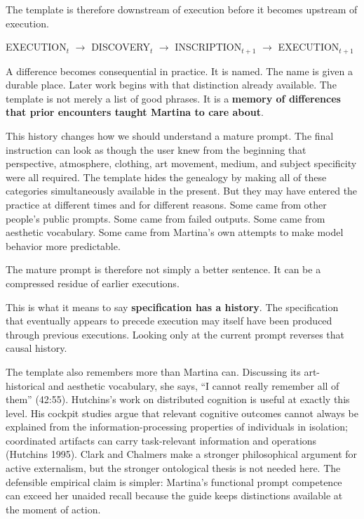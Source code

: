 \documentclass[
  11pt,
  letterpaper,
]{article}
\begin{document}
The template is therefore downstream of execution before it becomes
upstream of execution.

\begin{center}
EXECUTION$_t$ $\rightarrow$ DISCOVERY$_t$ $\rightarrow$ INSCRIPTION$_{t+1}$ $\rightarrow$ EXECUTION$_{t+1}$
\end{center}

A difference becomes consequential in practice. It is named. The name is
given a durable place. Later work begins with that distinction already
available. The template is not merely a list of good phrases. It is a
\textbf{memory of differences that prior encounters taught Martina to
care about}.

This history changes how we should understand a mature prompt. The final
instruction can look as though the user knew from the beginning that
perspective, atmosphere, clothing, art movement, medium, and subject
specificity were all required. The template hides the genealogy by
making all of these categories simultaneously available in the present.
But they may have entered the practice at different times and for
different reasons. Some came from other people's public prompts. Some
came from failed outputs. Some came from aesthetic vocabulary. Some came
from Martina's own attempts to make model behavior more predictable.

The mature prompt is therefore not simply a better sentence. It can be a
compressed residue of earlier executions.

This is what it means to say \textbf{specification has a history}. The
specification that eventually appears to precede execution may itself
have been produced through previous executions. Looking only at the
current prompt reverses that causal history.

The template also remembers more than Martina can. Discussing its
art-historical and aesthetic vocabulary, she says, ``I cannot really
remember all of them'' (42:55). Hutchins's work on distributed cognition
is useful at exactly this level. His cockpit studies argue that relevant
cognitive outcomes cannot always be explained from the
information-processing properties of individuals in isolation;
coordinated artifacts can carry task-relevant information and operations
(Hutchins 1995). Clark and Chalmers make a stronger philosophical
argument for active externalism, but the stronger ontological thesis is
not needed here. The defensible empirical claim is simpler: Martina's
functional prompt competence can exceed her unaided recall because the
guide keeps distinctions available at the moment of action.
\end{document}
